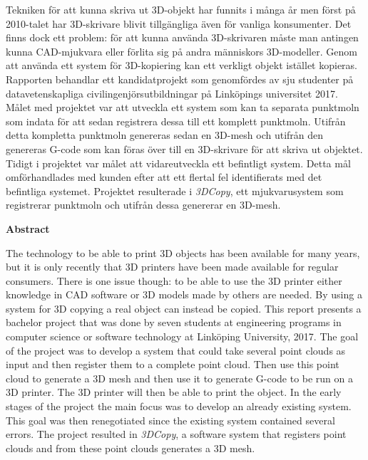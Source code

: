 \noindent
Tekniken för att kunna skriva ut 3D-objekt har funnits i många år men först på 2010-talet har 3D-skrivare blivit tillgängliga även för vanliga konsumenter. Det finns dock ett problem: för att kunna använda 3D-skrivaren måste man antingen kunna CAD-mjukvara eller förlita sig på andra människors 3D-modeller. Genom att använda ett system för 3D-kopiering kan ett verkligt objekt istället kopieras. Rapporten behandlar ett kandidatprojekt som genomfördes av sju studenter på datavetenskapliga civilingenjörsutbildningar på Linköpings universitet 2017. Målet med projektet var att utveckla ett system som kan ta separata punktmoln som indata för att sedan registrera dessa till ett komplett punktmoln. Utifrån detta kompletta punktmoln genereras sedan en 3D-mesh och utifrån den genereras G-code som kan föras över till en 3D-skrivare för att skriva ut objektet. Tidigt i projektet var målet att vidareutveckla ett befintligt system. Detta mål omförhandlades med kunden efter att ett flertal fel identifierats med det befintliga systemet. Projektet resulterade i \textit{3DCopy}, ett mjukvarusystem som registrerar punktmoln och utifrån dessa genererar en 3D-mesh.
\bigskip

\begin{center}
\textbf{Abstract}
\end{center}

\noindent
The technology to be able to print 3D objects has been available for many years, but it is only recently that 3D printers have been made available for regular consumers. There is one issue though: to be able to use the 3D printer either knowledge in CAD software or 3D models made by others are needed. By using a system for 3D copying a real object can instead be copied. This report presents a bachelor project that was done by seven students at engineering programs in computer science or software technology at Linköping University, 2017. The goal of the project was to develop a system that could take several point clouds as input and then register them to a complete point cloud. Then use this point cloud to generate a 3D mesh and then use it to generate G-code to be run on a 3D printer. The 3D printer will then be able to print the object. In the early stages of the project the main focus was to develop an already existing system. This goal was then renegotiated since the existing system contained several errors. The project resulted in \textit{3DCopy}, a software system that registers point clouds and from these point clouds generates a 3D mesh.

